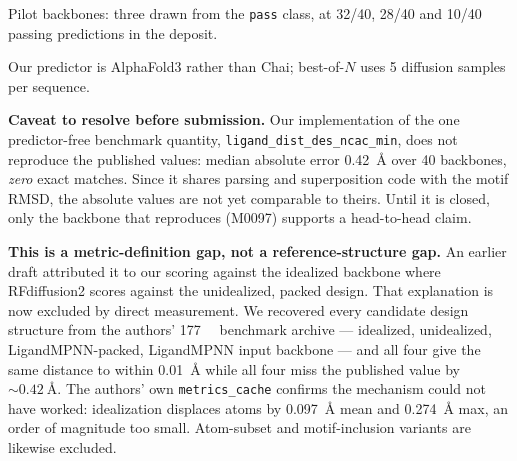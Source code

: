 \begin{planlist}
  \item Pilot backbones: three drawn from the \texttt{pass} class, at
        32/40, 28/40 and 10/40 passing predictions in the deposit.
  \item Our predictor is AlphaFold3 rather than Chai; best-of-$N$ uses 5
        diffusion samples per sequence.
  \item \textbf{Caveat to resolve before submission.} Our implementation of the
        one predictor-free benchmark quantity, \texttt{ligand\_dist\_des\_ncac\_min},
        does not reproduce the published values: median absolute error
        \SI{0.42}{\angstrom} over 40 backbones, \emph{zero} exact matches. Since
        it shares parsing and superposition code with the motif RMSD, the
        absolute values are not yet comparable to theirs. Until it is closed,
        only the backbone that reproduces (M0097) supports a head-to-head claim.
  \item \textbf{This is a metric-definition gap, not a reference-structure
        gap.} An earlier draft attributed it to our scoring against the
        idealized backbone where RFdiffusion2 scores against the unidealized,
        packed design. That explanation is now excluded by direct measurement.
        We recovered every candidate design structure from the authors'
        \SI{177}{\giga\byte} benchmark archive --- idealized, unidealized,
        LigandMPNN-packed, LigandMPNN input backbone --- and all four give the
        same distance to within \SI{0.01}{\angstrom} while all four miss the
        published value by ${\sim}\SI{0.42}{\angstrom}$. The authors' own
        \texttt{metrics\_cache} confirms the mechanism could not have worked:
        idealization displaces atoms by \SI{0.097}{\angstrom} mean and
        \SI{0.274}{\angstrom} max, an order of magnitude too small. Atom-subset
        and motif-inclusion variants are likewise excluded.
\end{planlist}


